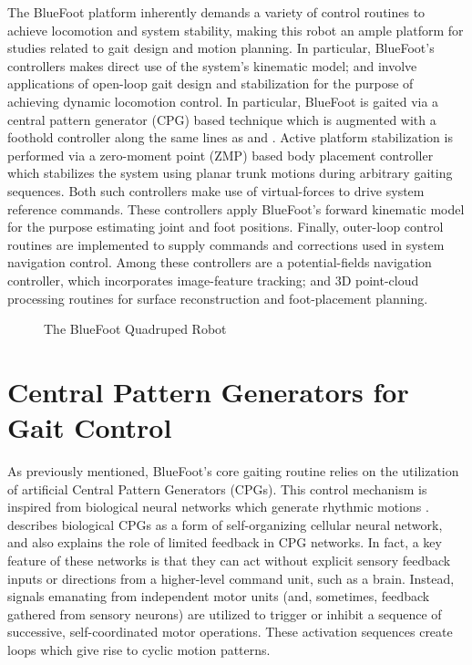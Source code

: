 		The BlueFoot platform inherently demands a variety of control routines to achieve locomotion and system stability, making this robot an ample platform for studies related to gait design and motion planning. In particular, BlueFoot's controllers makes direct use of the system's kinematic model; and involve applications of open-loop gait design and stabilization for the purpose of achieving dynamic locomotion control. In particular, BlueFoot is gaited via a central pattern generator (CPG) based technique which is augmented with a foothold controller along the same lines as \cite{Ajallooeian2013} and \cite{Rutishauser2008}. Active platform stabilization is performed via a zero-moment point (ZMP) based body placement controller which stabilizes the system using planar trunk motions during arbitrary gaiting sequences. Both such controllers make use of virtual-forces to drive system reference commands. These controllers apply BlueFoot's forward kinematic model for the purpose estimating joint and foot positions. Finally, outer-loop control routines are implemented to supply commands and corrections used in system navigation control. Among these controllers are a potential-fields navigation controller, which incorporates image-feature tracking; and 3D point-cloud processing routines for surface reconstruction and foot-placement planning.
	
			\begin{figure}[h!]
				\centering
				\caption{The BlueFoot Quadruped Robot}
				\label{fig::bluefoot_glamour}
			\end{figure}





	\section{Central Pattern Generators for Gait Control}

		As previously mentioned, BlueFoot's core gaiting routine relies on the utilization of artificial Central Pattern Generators (CPGs). This control mechanism is inspired from biological neural networks which generate rhythmic motions \cite{Ijspeert2008}. \cite{Arena2000} describes biological CPGs as a form of self-organizing cellular neural network, and also explains the role of limited feedback in CPG networks. In fact, a key feature of these networks is that they can act without explicit sensory feedback inputs or directions from a higher-level command unit, such as a brain. Instead, signals emanating from independent motor units (and, sometimes, feedback gathered from sensory neurons) are utilized to trigger or inhibit a sequence of successive, self-coordinated motor operations. These activation sequences create loops which give rise to cyclic motion patterns. 

